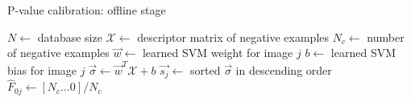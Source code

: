  
      \begin{algorithm}
          \caption{P-value calibration: offline stage}
          \label{alg:offline}
          \begin{algorithmic}[1]
              \State $N \gets$ database size
              \State $\mathcal{X} \gets$ descriptor matrix of negative examples %
                \State $N_c \gets$ number of negative examples
                \State $\vec{w} \gets$ learned SVM weight for image $j$
                \State $b \gets$ learned SVM bias for image $j$
                \State $\vec{\sigma} \gets \vec{w}^T \mathcal{X}+b$
                \State $\vec{s_j} \gets$ sorted $\vec{\sigma}$ in descending order
                \State $\hat{F}_{0j} \gets [N_c \dots 0]/N_c$
              \EndFor
              \EndProcedure
         \end{algorithmic}
      \end{algorithm}

